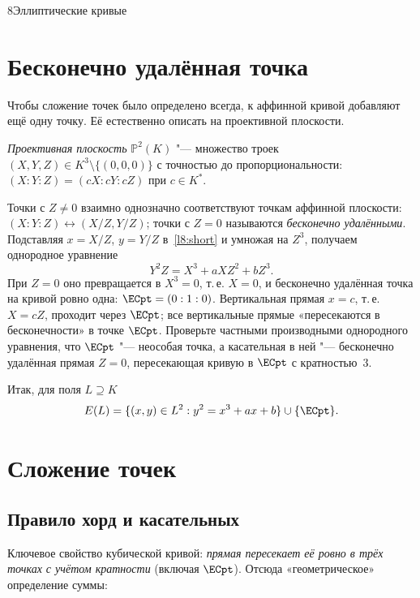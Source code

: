 \begin{lecture}{8}{Эллиптические кривые}


\section{Бесконечно удалённая точка}\label{l8:infinity}

Чтобы сложение точек было определено всегда, к аффинной кривой добавляют ещё одну точку.
Её естественно описать на проективной плоскости.

\begin{definition}
\emph{Проективная плоскость} $\mathbb P^2(K)$ "--- множество троек $(X, Y, Z) \in K^3 \setminus
\{(0, 0, 0)\}$ с точностью до пропорциональности: $(X : Y : Z) = (cX : cY : cZ)$ при
$c \in K^*$.
\end{definition}

Точки с $Z \ne 0$ взаимно однозначно соответствуют точкам аффинной плоскости:
$(X : Y : Z) \leftrightarrow (X/Z, Y/Z)$; точки с $Z = 0$ называются \emph{бесконечно
удалёнными}. Подставляя $x = X/Z$, $y = Y/Z$ в~\eqref{l8:short} и умножая на $Z^3$, получаем
однородное уравнение
\[
  Y^2 Z = X^3 + a X Z^2 + b Z^3.
\]
При $Z = 0$ оно превращается в $X^3 = 0$, т.\,е. $X = 0$, и бесконечно удалённая точка на кривой
ровно одна: $\ECpt = (0 : 1 : 0)$. Вертикальная прямая $x = c$, т.\,е. $X = cZ$, проходит через
$\ECpt$; все вертикальные прямые «пересекаются в бесконечности» в точке $\ECpt$. Проверьте
частными производными однородного уравнения, что $\ECpt$ "--- неособая точка, а касательная в
ней "--- бесконечно удалённая прямая $Z = 0$, пересекающая кривую в $\ECpt$ с кратностью~$3$.

Итак, для поля $L \supseteq K$
\[
  E(L) = \{(x, y) \in L^2 : y^2 = x^3 + ax + b\} \cup \{\ECpt\}.
\]

\section{Сложение точек}

\subsection{Правило хорд и касательных}

Ключевое свойство кубической кривой: \emph{прямая пересекает её ровно в трёх точках с учётом
кратности} (включая $\ECpt$). Отсюда «геометрическое» определение суммы:


\end{lecture}
